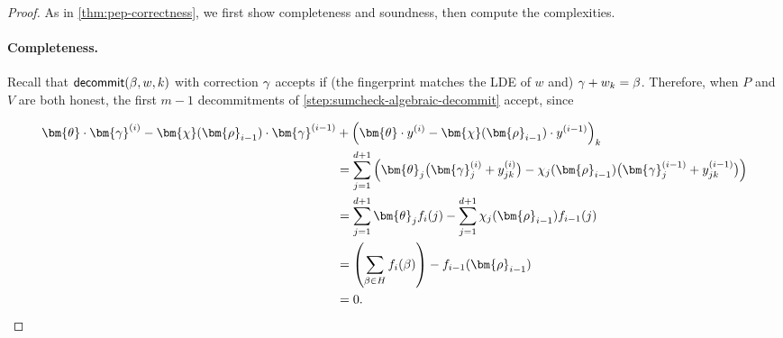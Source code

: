 \documentclass[10pt,a4paper]{article}
\newif\iflipics\lipicsfalse
\theoremstyle{definition}
\newcommand{\pcommitstring}{y}
\newcommand{\dimension}{m}
\newcommand{\degree}{d}
\newcommand{\fingerprinttuple}{\bm{\rho}}
\newcommand{\cubeside}{H}
\def\fe#1{
    \ifnum#1=1
        \alpha
    \else
    \ifnum#1=2
        \beta
    \else
    \ifnum#1=3
        \gamma
    \fi\fi\fi
}
\begin{document}
\begin{proof}
    As in \cref{thm:pep-correctness}, we first show completeness and soundness, then compute the complexities.
    
    \paragraph*{Completeness\iflipics\else.\fi} Recall that $\textsf{decommit}(\fe2, w, k)$ with correction $\fe3$ accepts if (the fingerprint matches the LDE of $w$ and) $\fe3 + w_k = \fe2$. Therefore, when $P$ and $V$ are both honest, the first $\dimension - 1$ decommitments of \cref{step:sumcheck-algebraic-decommit} accept, since
    
    \begin{align*}
        \bm{\theta} \cdot \bm{\fe3}^{(i)} - \bm{\chi}(\fingerprinttuple_{i-1}) \cdot \bm{\fe3}^{(i-1)} &+ \left(\bm{\theta} \cdot \pcommitstring^{(i)} - \bm{\chi}(\fingerprinttuple_{i-1}) \cdot \pcommitstring^{(i-1)}\right)_k\\
        &= \sum_{j = 1}^{\degree + 1} \left(\bm{\theta}_j \big(\bm{\fe3}^{(i)}_j + \pcommitstring^{(i)}_{jk}\big) - \chi_j(\fingerprinttuple_{i-1}) \big(\bm{\fe3}^{(i-1)}_j + \pcommitstring^{(i-1)}_{jk}\big)\right)\\
        &= \sum_{j = 1}^{\degree + 1} \bm{\theta}_j f_i(j) - \sum_{j = 1}^{\degree + 1} \chi_j(\fingerprinttuple_{i-1})
         f_{i-1}(j)\\
        &= \left(\sum_{\fe2 \in \cubeside} f_i(\fe2)\right) - f_{i-1}(\fingerprinttuple_{i-1})\\
        &= 0.
    \end{align*}
    

\end{proof}
\end{document}
